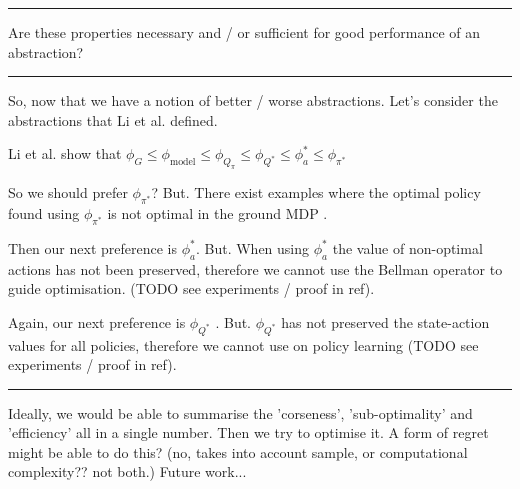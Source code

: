 \cite{Allen-Zhu2016a}





\begin{center}\rule{0.5\linewidth}{\linethickness}\end{center}
  {\color{red}Are these properties necessary and / or sufficient for good performance of an abstraction?}
\begin{center}\rule{0.5\linewidth}{\linethickness}\end{center}

So, now that we have a notion of better / worse abstractions. Let's consider the abstractions
that Li et al. \cite{Littman2006} defined.

Li et al. \cite{Littman2006} show that $\phi_G \le \phi_{\text{model}} \le \phi_{Q_{\pi}} \le \phi_{Q^{* }} \le \phi_a^{* } \le \phi_{\pi^{* }}$

So we should prefer $\phi_{\pi^{* }}$? But. There exist examples where the
optimal policy found using $\phi_{\pi^{* }}$ is not optimal in the ground MDP \cite{Jong2005}.

Then our next preference is $\phi_a^{* }$. But. When using $\phi_a^{* }$ the value of non-optimal actions has not been preserved,
therefore we cannot use the Bellman operator to guide optimisation. ({\color{red}TODO} see experiments / proof in ref).

Again, our next preference is $\phi_{Q^{* }}$ .
But. $\phi_{Q^{* }}$ has not preserved the state-action values for all policies,
therefore we cannot use on policy learning ({\color{red}TODO} see experiments / proof in ref).

\begin{center}\rule{0.5\linewidth}{\linethickness}\end{center}

Ideally, we would be able to summarise the 'corseness', 'sub-optimality' and 'efficiency' all in a single number.
Then we try to optimise it. A form of regret might be able to do this? (no, takes into account sample, or computational complexity?? not both.) Future work...

